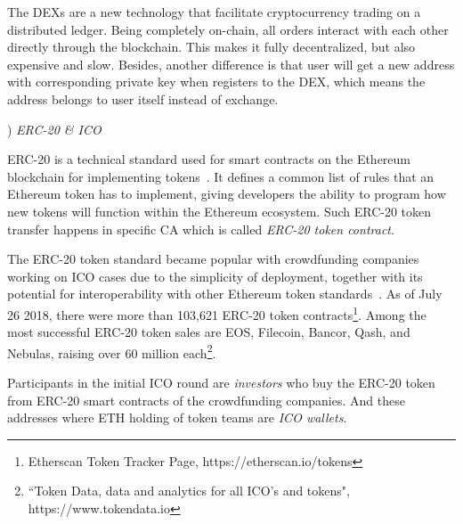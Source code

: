 
The DEXs are a new technology that facilitate cryptocurrency trading on a distributed ledger. Being completely on-chain, all orders interact with each other directly through the blockchain. This makes it fully decentralized, but also expensive and slow. Besides, another difference is that user will get a new address with corresponding private key when registers to the DEX, which means the address belongs to user itself instead of exchange. 
 



) \emph{ERC-20 \& ICO}

ERC-20 is a technical standard used for smart contracts on the Ethereum blockchain for implementing tokens~\cite{erc-20-wiki}. It defines a common list of rules that an Ethereum token has to implement, giving developers the ability to program how new tokens will function within the Ethereum ecosystem. Such ERC-20 token transfer happens in specific CA which is called \emph{ERC-20 token contract}. %

The ERC-20 token standard became popular with crowdfunding companies working on ICO cases due to the simplicity of deployment, together with its potential for interoperability with other Ethereum token standards~\cite{erc-20}. As of July 26 2018, there were more than 103,621 ERC-20 token contracts\footnote{Etherscan Token Tracker Page, https://etherscan.io/tokens}. Among the most successful ERC-20 token sales are EOS, Filecoin, Bancor, Qash, and Nebulas, raising over 60 million each\footnote{``Token Data, data and analytics for all ICO's and tokens", https://www.tokendata.io}.

Participants in the initial ICO round are \emph{investors} who buy the ERC-20 token from ERC-20 smart contracts of the crowdfunding companies. And these addresses where ETH holding of token teams are \emph{ICO wallets}.

